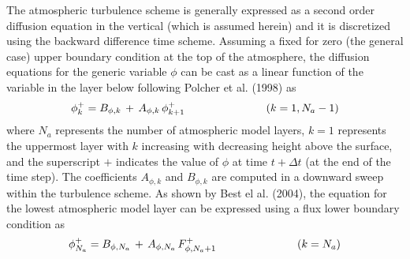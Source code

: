 {The atmospheric turbulence scheme is generally expressed as 
a second order diffusion equation in the vertical (which is assumed
herein) and it is discretized using the backward difference time
scheme. 
%
% 
Assuming a fixed for zero (the general case) upper boundary condition
at the top of the atmosphere, the diffusion equations for the 
generic variable $\phi$ can be cast as a
linear function of the variable in the layer below following 
Polcher et al. (1998)\nocite{Polcher1998}
as
%
%
\begin{equation}
\label{eq:meb_atmos_diffsn}
\phi_k^+ = B_{\phi,k} \,+\, A_{\phi,k}\,\phi_{k+1}^+
\hskip1.in \left( k=1,N_a-1\right)
\end{equation}
%
where $N_a$ represents the number of atmospheric model layers,
$k=1$ represents the uppermost layer with $k$ increasing with
decreasing height above the surface, and the superscript $+$ indicates the
value of $\phi$ at time $t+\Delta t$ (at the end of the time step).
The coefficients $A_{\phi,k}$
and $B_{\phi,k}$ are computed in a downward sweep within the
turbulence scheme.
%
As shown by 
Best el al. (2004)\nocite{Best2004}, 
the equation for the lowest atmospheric
model layer can be expressed using a flux lower boundary condition as
%
\begin{equation}
\label{eq:meb_atmos_diffsn_sfcbc}
\phi_{N_a}^+ = B_{\phi,N_a} \,+\, A_{\phi,N_a}\,F_{\phi,N_a+1}^+
\hskip1.in \left( k=N_a\right)
\end{equation}
}
